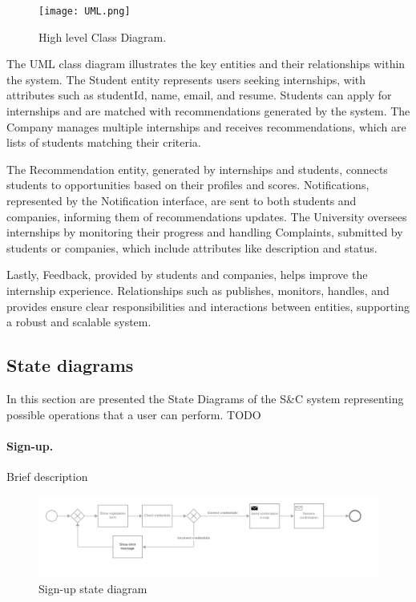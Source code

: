 \begin{figure}[H]
    \begin{center}
        \texttt{[image: UML.png]}
        \caption{High level Class Diagram.}
        \label{fig:UML}%
    \end{center}
\end{figure}

The UML class diagram illustrates the key entities and their relationships within the system. The Student entity represents users seeking internships, with attributes such as studentId, name, email, and resume. Students can apply for internships and are matched with recommendations generated by the system. The Company manages multiple internships and receives recommendations, which are lists of students matching their criteria.

The Recommendation entity, generated by internships and students, connects students to opportunities based on their profiles and scores. Notifications, represented by the Notification interface, are sent to both students and companies, informing them of recommendations updates. The University oversees internships by monitoring their progress and handling Complaints, submitted by students or companies, which include attributes like description and status.

Lastly, Feedback, provided by students and companies, helps improve the internship experience. Relationships such as publishes, monitors, handles, and provides ensure clear responsibilities and interactions between entities, supporting a robust and scalable system.\\


\subsection{State diagrams}
\label{subsec:state_diagrams}%
In this section are presented the State Diagrams of the S\&C system representing possible operations that a user can perform.
TODO

\paragraph{Sign-up.}
Brief description

\begin{figure}[H]
    \begin{center}
        \includegraphics[width=1\linewidth]{RASD/LaTeX/Images/StateDiagrams/signup.png}
        \caption{Sign-up state diagram}
        \label{fig:signup_sd}%
    \end{center}
\end{figure}

